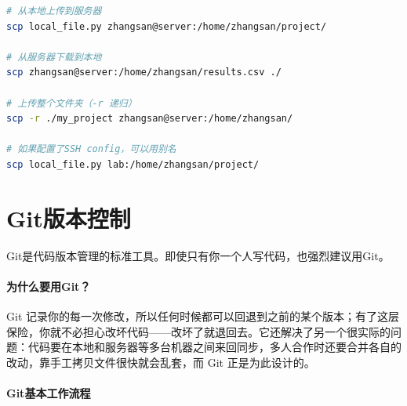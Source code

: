\begin{lstlisting}[language=bash, caption=在本地和服务器之间传输文件]
# 从本地上传到服务器
scp local_file.py zhangsan@server:/home/zhangsan/project/

# 从服务器下载到本地
scp zhangsan@server:/home/zhangsan/results.csv ./

# 上传整个文件夹（-r 递归）
scp -r ./my_project zhangsan@server:/home/zhangsan/

# 如果配置了SSH config，可以用别名
scp local_file.py lab:/home/zhangsan/project/
\end{lstlisting}

\section*{Git版本控制}

Git是代码版本管理的标准工具。即使只有你一个人写代码，也强烈建议用Git。

\paragraph{为什么要用Git？}

Git 记录你的每一次修改，所以任何时候都可以回退到之前的某个版本；有了这层保险，你就不必担心改坏代码——改坏了就退回去。它还解决了另一个很实际的问题：代码要在本地和服务器等多台机器之间来回同步，多人合作时还要合并各自的改动，靠手工拷贝文件很快就会乱套，而 Git 正是为此设计的。

\paragraph{Git基本工作流程}\mbox{}\par\nopagebreak

